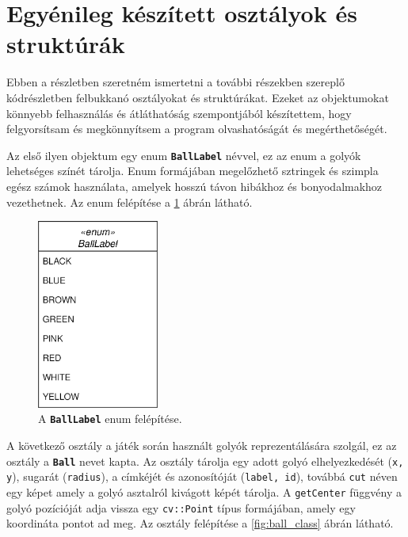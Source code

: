 \section{Egyénileg készített osztályok és struktúrák}
\label{section:classes_and_structs}
Ebben a részletben szeretném ismertetni a további részekben szereplő kódrészletben felbukkanó osztályokat és struktúrákat. Ezeket az objektumokat könnyebb felhasználás és átláthatóság szempontjából készítettem, hogy felgyorsítsam és megkönnyítsem a program olvashatóságát és megérthetőségét.
\par Az első ilyen objektum egy enum \textbf{\lstinline{BallLabel}} névvel, ez az enum a golyók lehetséges színét tárolja. Enum formájában megelőzhető sztringek és szimpla egész számok használata, amelyek hosszú távon hibákhoz és bonyodalmakhoz vezethetnek. Az enum felépítése a \ref{fig:balllabel_enum} ábrán látható.

\begin{figure}[!ht]
    \centering
    \includegraphics[width=40mm, keepaspectratio]{figures/balllabel_enum.png}
    \caption{A \textbf{\lstinline{BallLabel}} enum felépítése.}
    \label{fig:balllabel_enum}
\end{figure}

\par A következő osztály a játék során használt golyók reprezentálására szolgál, ez az osztály a \textbf{\lstinline{Ball}} nevet kapta. Az osztály tárolja egy adott golyó elhelyezkedését (\lstinline{x, y}), sugarát (\lstinline{radius}), a címkéjét és azonosítóját (\lstinline{label, id}), továbbá \lstinline{cut} néven egy képet amely a golyó asztalról kivágott képét tárolja. A \lstinline{getCenter} függvény a golyó pozícióját adja vissza egy \lstinline{cv::Point} típus\cite{opencv_docs} formájában, amely egy koordináta pontot ad meg. Az osztály felépítése a \ref{fig:ball_class} ábrán látható.

